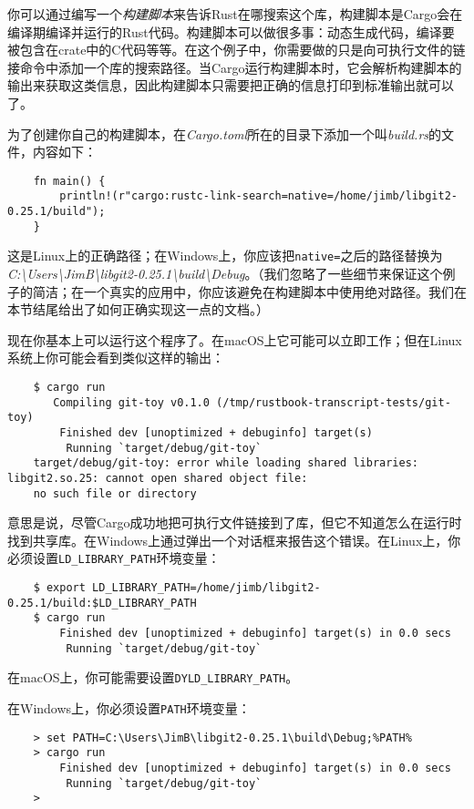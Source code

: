 你可以通过编写一个\emph{构建脚本}来告诉Rust在哪搜索这个库，构建脚本是Cargo会在编译期编译并运行的Rust代码。构建脚本可以做很多事：动态生成代码，编译要被包含在crate中的C代码等等。在这个例子中，你需要做的只是向可执行文件的链接命令中添加一个库的搜索路径。当Cargo运行构建脚本时，它会解析构建脚本的输出来获取这类信息，因此构建脚本只需要把正确的信息打印到标准输出就可以了。

为了创建你自己的构建脚本，在\emph{Cargo.toml}所在的目录下添加一个叫\emph{build.rs}的文件，内容如下：
\begin{verbatim}
    fn main() {
        println!(r"cargo:rustc-link-search=native=/home/jimb/libgit2-0.25.1/build");
    }
\end{verbatim}

这是Linux上的正确路径；在Windows上，你应该把\texttt{native=}之后的路径替换为\\
\emph{C:\textbackslash{}Users\textbackslash{}JimB\textbackslash{}libgit2-0.25.1\textbackslash{}build\textbackslash{}Debug}。（我们忽略了一些细节来保证这个例子的简洁；在一个真实的应用中，你应该避免在构建脚本中使用绝对路径。我们在本节结尾给出了如何正确实现这一点的文档。）

现在你基本上可以运行这个程序了。在macOS上它可能可以立即工作；但在Linux系统上你可能会看到类似这样的输出：
\begin{verbatim}
    $ cargo run
       Compiling git-toy v0.1.0 (/tmp/rustbook-transcript-tests/git-toy)
        Finished dev [unoptimized + debuginfo] target(s)
         Running `target/debug/git-toy`
    target/debug/git-toy: error while loading shared libraries: libgit2.so.25: cannot open shared object file:
    no such file or directory
\end{verbatim}

意思是说，尽管Cargo成功地把可执行文件链接到了库，但它不知道怎么在运行时找到共享库。在Windows上通过弹出一个对话框来报告这个错误。在Linux上，你必须设置\texttt{LD\_LIBRARY\_PATH}环境变量：
\begin{verbatim}
    $ export LD_LIBRARY_PATH=/home/jimb/libgit2-0.25.1/build:$LD_LIBRARY_PATH
    $ cargo run
        Finished dev [unoptimized + debuginfo] target(s) in 0.0 secs
         Running `target/debug/git-toy`
\end{verbatim}

在macOS上，你可能需要设置\texttt{DYLD\_LIBRARY\_PATH}。

在Windows上，你必须设置\texttt{PATH}环境变量：
\begin{verbatim}
    > set PATH=C:\Users\JimB\libgit2-0.25.1\build\Debug;%PATH%
    > cargo run
        Finished dev [unoptimized + debuginfo] target(s) in 0.0 secs
         Running `target/debug/git-toy`
    >
\end{verbatim}

